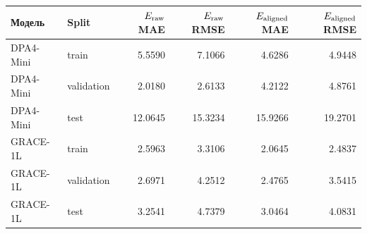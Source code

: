 \begin{center}
\small
\begin{tabular}{llrrrr}
\toprule
Модель & Split & $E_{\rm raw}$ MAE & $E_{\rm raw}$ RMSE & $E_{\rm aligned}$ MAE & $E_{\rm aligned}$ RMSE\\
\midrule
DPA4-Mini & train & 5.5590 & 7.1066 & 4.6286 & 4.9448\\
DPA4-Mini & validation & 2.0180 & 2.6133 & 4.2122 & 4.8761\\
DPA4-Mini & test & 12.0645 & 15.3234 & 15.9266 & 19.2701\\
\midrule
GRACE-1L & train & 2.5963 & 3.3106 & 2.0645 & 2.4837\\
GRACE-1L & validation & 2.6971 & 4.2512 & 2.4765 & 3.5415\\
GRACE-1L & test & 3.2541 & 4.7379 & 3.0464 & 4.0831\\
\bottomrule
\end{tabular}
\end{center}
